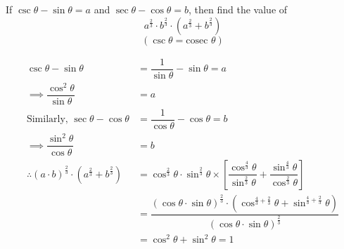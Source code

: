 

\question[3] If $\csc\theta - \sin\theta = a$ and $\sec\theta - \cos\theta = b$, then 
find the value of 
  \[ a^{\frac{2}{3}}\cdot b^{\frac{2}{3}}\cdot(a^{\frac{2}{3}}+b^{\frac{2}{3}}) \]
  \[ (\csc\theta = \text{cosec }\theta) \]

\ifprintanswers
\fi 

\begin{solution}[\halfpage]
	\begin{align}
		\csc\theta - \sin\theta &= \dfrac{1}{\sin\theta} - \sin\theta = a \\
		\implies \dfrac{\cos^2\theta}{\sin\theta} &= a \\
		\text{Similarly, }\sec\theta - \cos\theta &= \dfrac{1}{\cos\theta} - \cos\theta = b \\
		\implies \dfrac{\sin^2\theta}{\cos\theta} &= b \\
		\therefore (a\cdot b)^{\frac{2}{3}}\cdot(a^{\frac{2}{3}} + b^{\frac{2}{3}}) &= 
		\cos^{\frac{2}{3}}\theta\cdot\sin^{\frac{2}{3}}\theta\times
		\left[ \dfrac{\cos^{\frac{4}{3}}\theta}{\sin^{\frac{2}{3}}\theta} + 
		\dfrac{\sin^{\frac{4}{3}}\theta}{\cos^{\frac{2}{3}}\theta}\right] \\
    &= \dfrac{(\cos\theta\cdot\sin\theta)^
    {\frac{2}{3}}\cdot(\cos^{\frac{4}{3}+\frac{2}{3}}\theta + 
    \sin^{\frac{4}{3}+\frac{2}{3}}\theta)}{(\cos\theta\cdot\sin\theta)^{\frac{2}{3}}} \\
		&= \cos^2\theta + \sin^2\theta = 1
	\end{align}
\end{solution}
